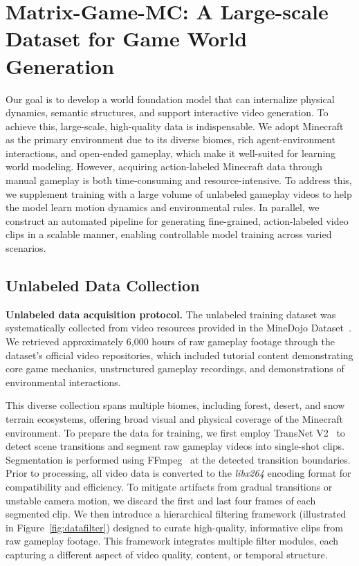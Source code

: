 \documentclass{article}
\begin{document}
 
 
\clearpage
\section{Matrix-Game-MC: A Large-scale Dataset for Game World Generation}

Our goal is to develop a world foundation model that can internalize physical dynamics, semantic structures, and support interactive video generation. To achieve this, large-scale, high-quality data is indispensable. We adopt Minecraft as the primary environment due to its diverse biomes, rich agent-environment interactions, and open-ended gameplay, which make it well-suited for learning world modeling. However, acquiring action-labeled Minecraft data through manual gameplay is both time-consuming and resource-intensive. To address this, we supplement training with a large volume of unlabeled gameplay videos to help the model learn motion dynamics and environmental rules. In parallel, we construct an automated pipeline for generating fine-grained, action-labeled video clips in a scalable manner, enabling controllable model training across varied scenarios.
 
 

\subsection{Unlabeled Data Collection} 

\textbf{Unlabeled data acquisition protocol.}
The unlabeled training dataset was systematically collected from video resources provided in the MineDojo Dataset~\cite{fan2022minedojo}. We retrieved approximately 6,000 hours of raw gameplay footage through the dataset's official video repositories, which included tutorial content demonstrating core game mechanics, unstructured gameplay recordings, and demonstrations of environmental interactions.

This diverse collection spans multiple biomes, including forest, desert, and snow terrain ecosystems, offering broad visual and physical coverage of the Minecraft environment. To prepare the data for training, we first employ TransNet V2~\cite{soucek2024transnet} to detect scene transitions and segment raw gameplay videos into single-shot clips. Segmentation is performed using FFmpeg~\cite{ffmpeg} at the detected transition boundaries. Prior to processing, all video data is converted to the \textit{libx264} encoding format for compatibility and efficiency. To mitigate artifacts from gradual transitions or unstable camera motion, we discard the first and last four frames of each segmented clip.
We then introduce a hierarchical filtering framework (illustrated in Figure~\ref{fig:datafilter}) designed to curate high-quality, informative clips from raw gameplay footage. This framework integrates multiple filter modules, each capturing a different aspect of video quality, content, or temporal structure.   
\end{document}
